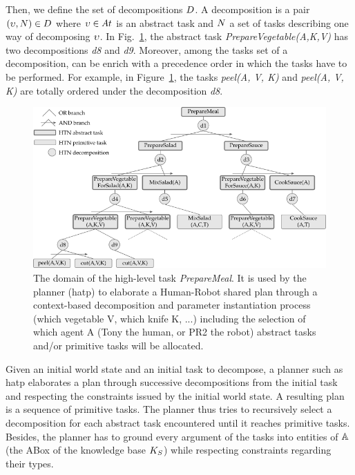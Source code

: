 Then, we define the set of decompositions $D$. A decomposition is a pair $(\upsilon, N) \in D$ where $\upsilon \in At$ is an abstract task and $N$ a set of tasks describing one way of decomposing $\upsilon$. In Fig.~\ref{fig:chap6_domain}, the abstract task \textit{PrepareVegetable(A,K,V)} has two decompositions \textit{d8} and \textit{d9}. Moreover, among the tasks set of a decomposition, can be enrich with a precedence order in which the tasks have to be performed. For example, in Figure~\ref{fig:chap6_domain}, the tasks \textit{peel(A, V, K)} and \textit{peel(A, V, K)} are totally ordered under the decomposition \textit{d8}. 

\begin{figure}[h!]
\centering
\includegraphics[width=\textwidth]{figures/chapter6/domain.png}
\caption{\label{fig:chap6_domain} The  domain of the high-level task \textit{PrepareMeal}. It is used by the planner (\acrshort{hatp}) to elaborate a Human-Robot shared plan through a context-based decomposition and parameter instantiation process (which vegetable V, which knife K, ...) including the selection of which agent A (Tony the human, or PR2 the robot) abstract tasks and/or primitive tasks will be allocated.}
\end{figure}

Given an initial world state and an initial task to decompose, a planner such as \acrshort{hatp} elaborates a plan through successive decompositions from the initial task and respecting the constraints issued by the initial world state. A resulting plan is a sequence of primitive tasks. The planner thus tries to recursively select a decomposition for each abstract task encountered until it reaches primitive tasks. Besides, the planner has to ground every argument of the tasks into entities of $\mathbb{A}$ (the ABox of the knowledge base $K_S$) while respecting constraints regarding their types.

